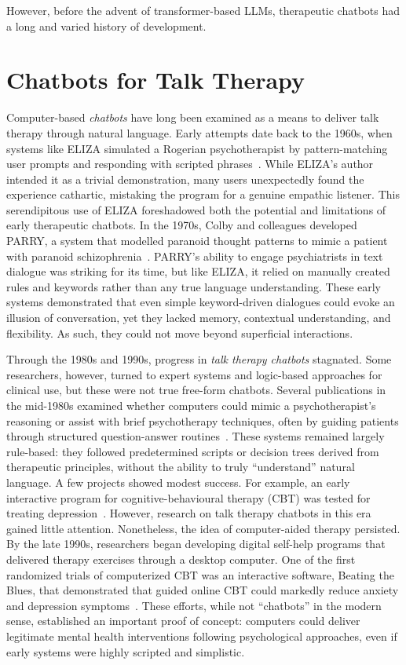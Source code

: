 However, before the advent of transformer-based LLMs, therapeutic chatbots had a long and varied history of development.


\section{Chatbots for Talk Therapy}
Computer-based \emph{chatbots} have long been examined as a means to deliver talk therapy through natural language. Early attempts date back to the 1960s, when systems like ELIZA simulated a Rogerian psychotherapist by pattern-matching user prompts and responding with scripted phrases~\cite{Weizenbaum1966}. While ELIZA's author intended it as a trivial demonstration, many users unexpectedly found the experience cathartic, mistaking the program for a genuine empathic listener. This serendipitous use of ELIZA foreshadowed both the potential and limitations of early therapeutic chatbots. In the 1970s, Colby and colleagues developed PARRY, a system that modelled paranoid thought patterns to mimic a patient with paranoid schizophrenia~\cite{Colby1971}. PARRY's ability to engage psychiatrists in text dialogue was striking for its time, but like ELIZA, it relied on manually created rules and keywords rather than any true language understanding. These early systems demonstrated that even simple keyword-driven dialogues could evoke an illusion of conversation, yet they lacked memory, contextual understanding, and flexibility. As such, they could not move beyond superficial interactions.


Through the 1980s and 1990s, progress in \emph{talk therapy chatbots} stagnated. Some researchers, however, turned to expert systems and logic-based approaches for clinical use, but these were not true free-form chatbots. Several publications in the mid-1980s examined whether computers could mimic a psychotherapist's reasoning or assist with brief psychotherapy techniques, often by guiding patients through structured question-answer routines~\cite{Hartman1986,Sampson1986,ServanSchreiber1986}. These systems remained largely rule-based: they followed predetermined scripts or decision trees derived from therapeutic principles, without the ability to truly ``understand'' natural language. A few projects showed modest success. For example, an early interactive program for cognitive-behavioural therapy (CBT) was tested for treating depression~\cite{Selmi1990}. However, research on talk therapy chatbots in this era gained little attention. Nonetheless, the idea of computer-aided therapy persisted. By the late 1990s, researchers began developing digital self-help programs that delivered therapy exercises through a desktop computer. One of the first randomized trials of computerized CBT was an interactive software, Beating the Blues, that demonstrated that guided online CBT could markedly reduce anxiety and depression symptoms~\cite{Proudfoot2003}. These efforts, while not ``chatbots'' in the modern sense, established an important proof of concept: computers could deliver legitimate mental health interventions following psychological approaches, even if early systems were highly scripted and simplistic.


